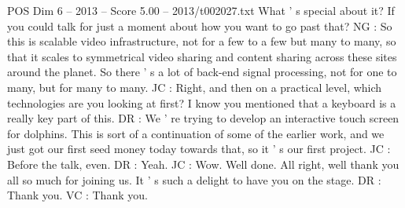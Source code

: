 \begin{textsample}{POS Dim 6 – 2013 – Score 5.00 – 2013/t002027.txt}
What ' s special about it?
If you could talk for just a moment about how you want to go past that?
NG : So this is scalable video infrastructure, not for a few to a few but many to many, so that it scales to symmetrical video sharing and content sharing across these sites around the planet.
So there ' s a lot of back-end signal processing, not for one to many, but for many to many.
JC : Right, and then on a practical level, which technologies are you looking at first?
I know you mentioned that a keyboard is a really key part of this.
DR : We ' re trying to develop an interactive touch screen for dolphins.
This is sort of a continuation of some of the earlier work, and we just got our first seed money today towards that, so it ' s our first project.
JC : Before the talk, even.
DR : Yeah.
JC : Wow.
Well done.
All right, well thank you all so much for joining us.
It ' s such a delight to have you on the stage.
DR : Thank you.
VC : Thank you.

\end{textsample}
